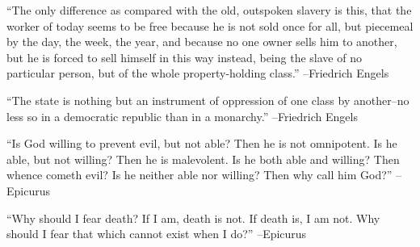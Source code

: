 \documentclass{article}%
\begin{document}
\linebreak%
\vspace{1mm}%
\begin{minipage}{\textwidth}%
\flushleft%
“The only difference as compared with the old, outspoken slavery is this, that the worker of today seems to be free because he is not sold once for all, but piecemeal by the day, the week, the year, and because no one owner sells him to another, but he is forced to sell himself in this way instead, being the slave of no particular person, but of the whole property{-}holding class.”%
\linebreak%
\vspace{1mm}%
–Friedrich Engels%
\linebreak%
\vspace{1mm}%
\end{minipage}%
\linebreak%
\vspace{1mm}%
\begin{minipage}{\textwidth}%
\flushleft%
“The state is nothing but an instrument of oppression of one class by another–no less so in a democratic republic than in a monarchy.”%
\linebreak%
\vspace{1mm}%
–Friedrich Engels%
\linebreak%
\vspace{1mm}%
\end{minipage}%
\linebreak%
\vspace{1mm}%
\begin{minipage}{\textwidth}%
\flushleft%
“Is God willing to prevent evil, but not able? Then he is not omnipotent. Is he able, but not willing? Then he is malevolent. Is he both able and willing? Then whence cometh evil? Is he neither able nor willing? Then why call him God?”%
\linebreak%
\vspace{1mm}%
–Epicurus%
\linebreak%
\vspace{1mm}%
\end{minipage}%
\linebreak%
\vspace{1mm}%
\begin{minipage}{\textwidth}%
\flushleft%
“Why should I fear death? If I am, death is not. If death is, I am not. Why should I fear that which cannot exist when I do?”%
\linebreak%
\vspace{1mm}%
–Epicurus%
\linebreak%
\vspace{1mm}%
\end{minipage}%
\end{document}

